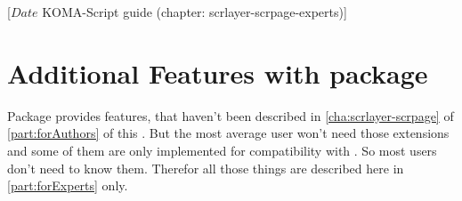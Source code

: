 %
%
%
%
%
%
%
%
% 
%
%
%
%

%
                 [$Date$
                  KOMA-Script guide (chapter: scrlayer-scrpage-experts)]


\chapter[{Additional Features of \Package{scrlayer-scrpage}}]
  {Additional Features with
    package }
%
%
Package  provides features, that haven't been
described in \autoref{cha:scrlayer-scrpage} of \autoref{part:forAuthors} of this
. But the most average user won't need those
extensions and some of them are only implemented for compatibility with
. So most users don't need to know them. Therefor all those
things are described here in \autoref{part:forExperts} only.

